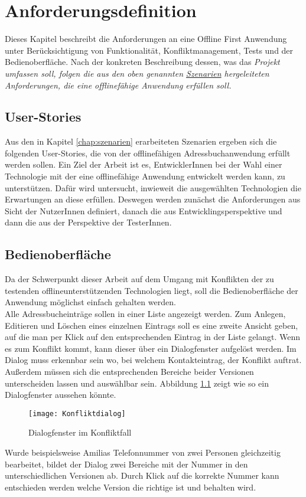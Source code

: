 \chapter{\label{chap:anforderungen}Anforderungsdefinition}
Dieses Kapitel beschreibt die Anforderungen an eine Offline First Anwendung unter Berücksichtigung von Funktionalität, Konfliktmanagement, Tests und der Bedienoberfläche.
Nach der konkreten Beschreibung dessen, was das \it{Projekt} umfassen soll, folgen die aus den oben genannten \hyperref[chap:szenarien]{Szenarien} hergeleiteten Anforderungen, die eine offlinefähige Anwendung erfüllen soll.
%
%

%
%
\section{User-Stories}
Aus den in Kapitel \ref{chap:szenarien} erarbeiteten Szenarien ergeben sich die folgenden User-Stories, die von der offlinefähigen Adressbuchanwendung erfüllt werden sollen.
Ein Ziel der Arbeit ist es, EntwicklerInnen bei der Wahl einer Technologie mit der eine offlinefähige Anwendung entwickelt werden kann, zu unterstützen. Dafür wird untersucht, inwieweit die ausgewählten Technologien die Erwartungen an diese erfüllen.
Deswegen werden zunächst die Anforderungen aus Sicht der NutzerInnen definiert, danach die aus Entwicklingsperspektive und dann die aus der Perspektive der TesterInnen.



%
%

%
%
\section{Bedienoberfläche}
Da der Schwerpunkt dieser Arbeit auf dem Umgang mit Konflikten der zu testenden offlineunterstützenden Technologien liegt, soll die Bedienoberfläche der Anwendung möglichst einfach gehalten werden.\\
Alle Adressbucheinträge sollen in einer Liste angezeigt werden. Zum Anlegen, Editieren und Löschen eines einzelnen Eintrags soll es eine zweite Ansicht geben, auf die man per Klick auf den entsprechenden Eintrag in der Liste gelangt.
Wenn es zum Konflikt kommt, kann dieser über ein Dialogfenster aufgelöst werden. Im Dialog muss erkennbar sein wo, bei welchem Kontakteintrag, der Konflikt auftrat.
Außerdem müssen sich die entsprechenden Bereiche beider Versionen unterscheiden lassen und auswählbar sein. Abbildung \ref{fig:dialog} zeigt wie so ein Dialogfenster aussehen könnte.
\begin{figure}[H]
	\centering
	\texttt{[image: Konfliktdialog]}
	\grayRule
	\caption{Dialogfenster im Konfliktfall}
	\label{fig:dialog}
\end{figure}
Wurde beispielsweise Amilias Telefonnummer von zwei Personen gleichzeitig bearbeitet, bildet der Dialog zwei Bereiche mit der Nummer in den unterschiedlichen Versionen ab.
Durch Klick auf die korrekte Nummer kann entschieden werden welche Version die richtige ist und behalten wird.
%
%

